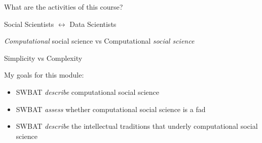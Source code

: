 \documentclass{beamer}
\begin{document}
\begin{frame}

\begin{center}
\LARGE{What are the activities of this course?}
\end{center}

\end{frame}
\begin{frame}

\begin{center}
\LARGE{Social Scientists $\longleftrightarrow$ Data Scientists}
\end{center}

\end{frame}
\begin{frame}

\emph{Computational} social science vs Computational \emph{social science}

\end{frame}
\begin{frame}

\begin{center}
\Large{Simplicity vs Complexity}
\end{center}

\end{frame}
\begin{frame}

My goals for this module:
\begin{itemize}
\item SWBAT \emph{describe} computational social science
\item SWBAT \emph{assess} whether computational social science is a fad
\item SWBAT \emph{describe} the intellectual traditions that underly computational social science
\end{itemize}

\end{frame}
\end{document}
